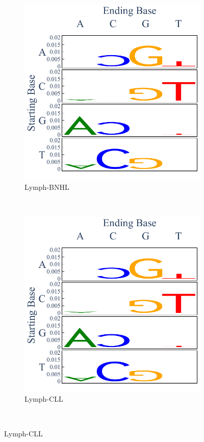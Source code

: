 \begin{figure}[ht!]
    \begin{subfigure}{.5\textwidth}
    \centering
    \includegraphics[scale=0.45]{graphics/spectra_Lymph-BNHL.pdf}
    \caption{Lymph-BNHL}
    \end{subfigure}
    ~
    \begin{subfigure}{.5\textwidth}
    \centering
    \includegraphics[scale=0.5]{graphics/spectra_Lymph-CLL.pdf}
    \caption{Lymph-CLL}
    \end{subfigure} \\
    

\end{figure}
